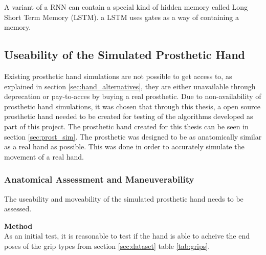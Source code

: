 \documentclass[../main.tex]{subfiles}
\begin{document}
A variant of a RNN can contain a special kind of hidden memory called Long Short Term Memory (LSTM).
a LSTM uses gates as a way of containing a memory.


%



\subsection{Useability of the Simulated Prosthetic Hand}

Existing prosthetic hand simulations are not possible to get access to, as explained in section \ref{sec:hand_alternatives}, they are either unavailable through deprecation or pay-to-acces by buying a real prosthetic.
Due to non-availability of prosthetic hand simulations, it was chosen that through this thesis, a open source prosthetic hand needed to be created for testing of the algorithms developed as part of this project.
The prosthetic hand created for this thesis can be seen in section \ref{sec:prost_sim}.
The prosthetic was designed to be as anatomically similar as a real hand as possible.
This was done in order to accurately simulate the movement of a real hand.

\subsubsection{Anatomical Assessment and Maneuverability}

The useability and moveability of the simulated prosthetic hand needs to be assessed.

\textbf{Method}\\
As an initial test, it is reasonable to test if the hand is able to acheive the end poses of the grip types from section \ref{sec:dataset} table \ref{tab:grips}. 
\end{document}
